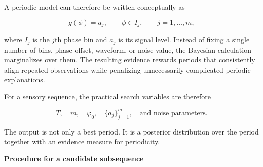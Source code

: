 \documentclass{book}
\providecommand{\ProjectDeepHeading}[2]{%
    \par\medskip\noindent\textbf{#2}\par\smallskip
}
\begin{document}
A periodic model can therefore be written conceptually as

\begin{equation}
g(\ensuremath{\phi})
=
a_j,
\qquad
\ensuremath{\phi}\in I_j,
\qquad
j=1,\ldots,m,
\end{equation}

where $I_j$ is the $j$th phase bin and $a_j$ is its signal level. Instead of fixing a single number of bins, phase offset, waveform, or noise value, the Bayesian calculation marginalizes over them. The resulting evidence rewards periods that consistently align repeated observations while penalizing unnecessarily complicated periodic explanations.

For a sensory sequence, the practical search variables are therefore

\begin{equation}
T,\quad m,\quad \ensuremath{\varphi}_0,\quad \{a_j\}_{j=1}^{m},\quad \text{and noise parameters}.
\end{equation}

The output is not only a best period. It is a posterior distribution over the period together with an evidence measure for periodicity.

\ProjectDeepHeading{4}{Procedure for a candidate subsequence}
\end{document}
